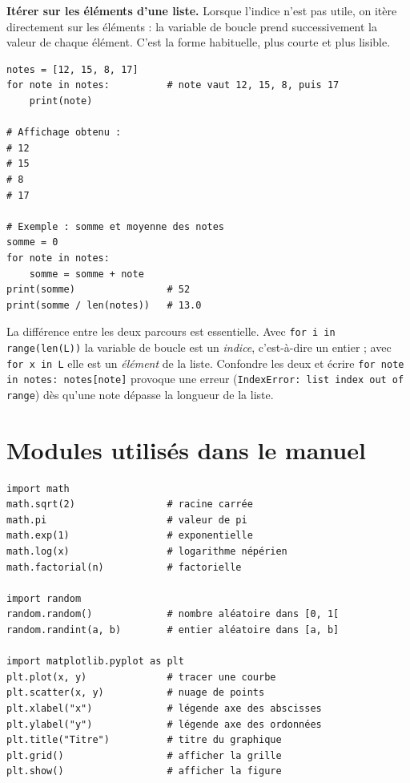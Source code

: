 \textbf{Itérer sur les éléments d'une liste.}
Lorsque l'indice n'est pas utile, on itère directement sur les éléments : la
variable de boucle prend successivement la valeur de chaque élément. C'est la
forme habituelle, plus courte et plus lisible.

\begin{verbatim}
notes = [12, 15, 8, 17]
for note in notes:          # note vaut 12, 15, 8, puis 17
    print(note)

# Affichage obtenu :
# 12
# 15
# 8
# 17

# Exemple : somme et moyenne des notes
somme = 0
for note in notes:
    somme = somme + note
print(somme)                # 52
print(somme / len(notes))   # 13.0
\end{verbatim}

La différence entre les deux parcours est essentielle. Avec
\verb|for i in range(len(L))| la variable de boucle est un \emph{indice},
c'est-à-dire un entier ; avec \verb|for x in L| elle est un \emph{élément} de
la liste. Confondre les deux et écrire \verb|for note in notes: notes[note]|
provoque une erreur (\verb|IndexError: list index out of range|) dès qu'une
note dépasse la longueur de la liste.

\section*{Modules utilisés dans le manuel}

\begin{verbatim}
import math
math.sqrt(2)                # racine carrée
math.pi                     # valeur de pi
math.exp(1)                 # exponentielle
math.log(x)                 # logarithme népérien
math.factorial(n)           # factorielle

import random
random.random()             # nombre aléatoire dans [0, 1[
random.randint(a, b)        # entier aléatoire dans [a, b]

import matplotlib.pyplot as plt
plt.plot(x, y)              # tracer une courbe
plt.scatter(x, y)           # nuage de points
plt.xlabel("x")             # légende axe des abscisses
plt.ylabel("y")             # légende axe des ordonnées
plt.title("Titre")          # titre du graphique
plt.grid()                  # afficher la grille
plt.show()                  # afficher la figure
\end{verbatim}


\newpage

